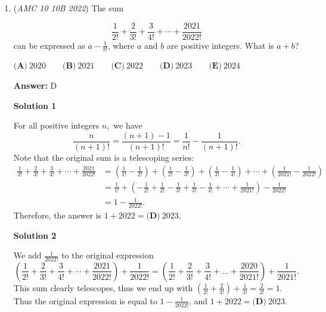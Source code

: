 \begin{enumerate}
 



\textbf{Solution 8 (Pigeonhole Principle, very fast)}

Consider any consecutive seven sets beginning on one more than a multiple of $70$. There are guaranteed to be $10$ multiples of $7$ in these seven sets. Note that no set may have three multiples of $7$. This means that some three of the ten sets have $2$ multiples of seven. There are $14$ such groups of seven sets, and then the sets $\{981, 982, \dots, 989\}$ and $\{991, 992, \dots, \}$. These last two sets are congruent to $\{1, 2, \dots, 9\}$ and $\{11, 12, \dots, 19\}$ modulo 7, thus making it easy to check that each only has one multiple of $7$. Therefore, there are $14 \cdot 3 = \boxed{\textbf{(D) }42}$ sets with $2$ multiples of $7$. 

 


	\item (\textit{AMC 10 10B 2022}) The sum

 \[\frac{1}{2!}+\frac{2}{3!}+\frac{3}{4!}+\cdots+\frac{2021}{2022!}\] can be expressed as $a-\frac{1}{b!}$, where $a$ and $b$ are positive integers. What is $a+b$?


 $\textbf{(A)}\ 2020 \qquad\textbf{(B)}\ 2021 \qquad\textbf{(C)}\ 2022 \qquad\textbf{(D)}\ 2023 \qquad\textbf{(E)}\ 2024$

 \textbf{Answer: }D



\textbf{Solution 1}

For all positive integers $n,$ we have 
 \[\frac{n}{(n+1)!}=\frac{(n+1)-1}{(n+1)!}=\frac{1}{n!}-\frac{1}{(n+1)!}.\]Note that the original sum is a telescoping series:
 \begin{align*} \frac{1}{2!}+\frac{2}{3!}+\frac{3}{4!}+\cdots+\frac{2021}{2022!}  &= \left(\frac{1}{1!}-\frac{1}{2!}\right)+\left(\frac{1}{2!}-\frac{1}{3!}\right)+\left(\frac{1}{3!}-\frac{1}{4!}\right)+\cdots+\left(\frac{1}{2021!}-\frac{1}{2022!}\right) \\ &= \frac{1}{1!}+\left(-\frac{1}{2!}+\frac{1}{2!}-\frac{1}{3!}+\frac{1}{3!}-\frac{1}{4!}+\cdots+\frac{1}{2021!}\right)-\frac{1}{2022!} \\ &= 1-\frac{1}{2022!}. \end{align*}
Therefore, the answer is $1+2022=\boxed{\textbf{(D)}\ 2023}.$




\textbf{Solution 2}

We add $\frac{1}{2022!}$ to the original expression 
 \[\left(\frac{1}{2!}+\frac{2}{3!}+\frac{3}{4!}+\cdots+\frac{2021}{2022!}\right)+\frac{1}{2022!}=\left(\frac{1}{2!}+\frac{2}{3!}+\frac{3}{4!}+\dots+\frac{2020}{2021!}\right)+\frac{1}{2021!}.\]This sum clearly telescopes, thus we end up with $\left(\frac{1}{2!}+\frac{2}{3!}\right)+\frac{1}{3!}=\frac{2}{2!}=1$. Thus the original expression is equal to $1-\frac{1}{2022!}$, and $1+2022=\boxed{\textbf{(D)}\ 2023}$.


\end{enumerate}
